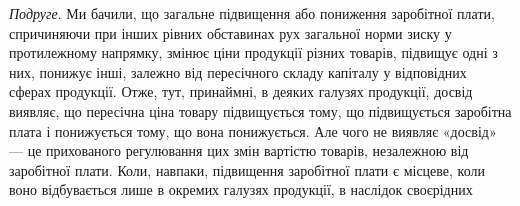 \emph{Подруге}. Ми бачили, що загальне підвищення або пониження заробітної
плати, спричиняючи при інших рівних обставинах рух загальної норми
зиску у протилежному напрямку, змінює ціни продукції різних товарів, підвищує
одні з них, понижує інші, залежно від пересічного складу капіталу у відповідних
сферах продукції. Отже, тут, принаймні, в деяких галузях продукції,
досвід виявляє, що пересічна ціна товару підвищується тому, що підвищується
заробітна плата і понижується тому, що вона понижується. Але чого не виявляє
«досвід» — це прихованого регулювання цих змін вартістю товарів, незалежною
від заробітної плати. Коли, навпаки, підвищення заробітної плати є місцеве, коли
воно відбувається лише в окремих галузях продукції, в наслідок своєрідних
\parbreak{}  %
